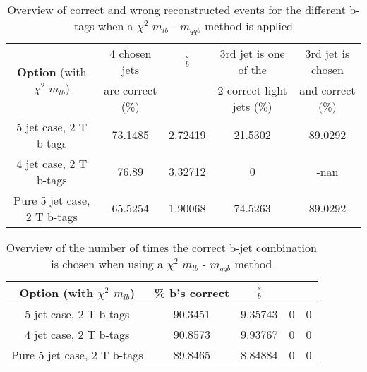  \begin{table}[!h] 
 \begin{tabular}{c|c|c|c|c} 
\multirow{2}{*}{\textbf{Option} (with $\chi^{2}$ $m_{lb}$)} & 4 chosen jets & $\frac{s}{b}$ & 3rd jet is one of the & 3rd jet is chosen \\ & are correct ($\%$)    & 	             & 2 correct light jets ($\%$) &  and correct ($\%$)	  \\ \hline 
 5 jet case,      2 T b-tags              & 73.1485 & 2.72419 & 21.5302 & 89.0292 \\ 
 4 jet case,      2 T b-tags              & 76.89 & 3.32712 & 0 & -nan \\ 
 Pure 5 jet case, 2 T b-tags              & 65.5254 & 1.90068 & 74.5263 & 89.0292 \\ 
 \end{tabular} 
 \caption{Overview of correct and wrong reconstructed events for the different b-tags when a $\chi^{2}$ $m_{lb}$ - $m_{qqb}$ method is applied} 
 \end{table} 
 
 \begin{table}[!h] 
 \begin{tabular}{c|c|c|c|c} 
 \textbf{Option} (with $\chi^{2}$ $m_{lb}$) & \% b's correct   & $\frac{s}{b}$ &  &  \\ \hline 
 5 jet case,      2 T b-tags              & 90.3451 & 9.35743 & 0 & 0 \\ 
 4 jet case,      2 T b-tags              & 90.8573 & 9.93767 & 0 & 0 \\ 
 Pure 5 jet case, 2 T b-tags              & 89.8465 & 8.84884 & 0 & 0 \\ 
 \end{tabular} 
 \caption{Overview of the number of times the correct b-jet combination is chosen when using a $\chi^{2}$ $m_{lb}$ - $m_{qqb}$ method} 
 \end{table} 
 
